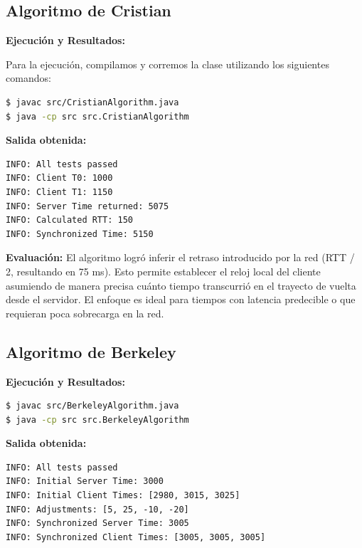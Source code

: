 \documentclass{article}
\begin{document}
\subsection{Algoritmo de Cristian}



\textbf{Ejecución y Resultados:}

Para la ejecución, compilamos y corremos la clase utilizando los siguientes comandos:
\begin{lstlisting}[language=bash, numbers=none, caption={Comandos de compilación y ejecución para Cristian}]
$ javac src/CristianAlgorithm.java
$ java -cp src src.CristianAlgorithm
\end{lstlisting}

\textbf{Salida obtenida:}
\begin{verbatim}
INFO: All tests passed
INFO: Client T0: 1000
INFO: Client T1: 1150
INFO: Server Time returned: 5075
INFO: Calculated RTT: 150
INFO: Synchronized Time: 5150
\end{verbatim}

\textbf{Evaluación:}
El algoritmo logró inferir el retraso introducido por la red (RTT / 2, resultando en 75 ms). Esto permite establecer el reloj local del cliente asumiendo de manera precisa cuánto tiempo transcurrió en el trayecto de vuelta desde el servidor. El enfoque es ideal para tiempos con latencia predecible o que requieran poca sobrecarga en la red.

\subsection{Algoritmo de Berkeley}



\textbf{Ejecución y Resultados:}

\begin{lstlisting}[language=bash, numbers=none, caption={Comandos de compilación y ejecución para Berkeley}]
$ javac src/BerkeleyAlgorithm.java
$ java -cp src src.BerkeleyAlgorithm
\end{lstlisting}

\textbf{Salida obtenida:}
\begin{verbatim}
INFO: All tests passed
INFO: Initial Server Time: 3000
INFO: Initial Client Times: [2980, 3015, 3025]
INFO: Adjustments: [5, 25, -10, -20]
INFO: Synchronized Server Time: 3005
INFO: Synchronized Client Times: [3005, 3005, 3005]
\end{verbatim}
\end{document}
